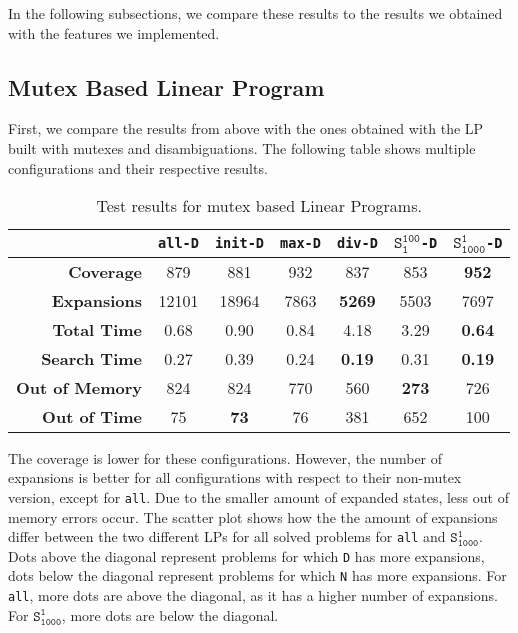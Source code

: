 In the following subsections, we compare these results to the results we obtained with the features we implemented.

\subsection{Mutex Based Linear Program}\label{subsec:mutex-based-linear-program}
First, we compare the results from above with the ones obtained with the LP built with mutexes and disambiguations.
The following table shows multiple configurations and their respective results.

\begin{table}[h!]
    \begin{center}
        \begin{tabular}{|r|c|c|c|c|c|c|}
            \hline
            & \textbf{\texttt{all-D}} & \textbf{\texttt{init-D}} & \textbf{\texttt{max-D}} & \textbf{\texttt{div-D}} & \textbf{$\texttt{S}_\texttt{1}^\texttt{100}$\texttt{-D}}& \textbf{$\texttt{S}_\texttt{1000}^\texttt{1}$\texttt{-D}}\\
            \hline \hline
            \textbf{Coverage}       & 879   & 881           & 932   & 837           & 853           & \textbf{952}  \\ \hline
            \textbf{Expansions}     & 12101 & 18964         & 7863  & \textbf{5269} & 5503          & 7697          \\ \hline
            \textbf{Total Time}     & 0.68  & 0.90          & 0.84  & 4.18          & 3.29          & \textbf{0.64} \\ \hline
            \textbf{Search Time}    & 0.27  & 0.39          & 0.24  & \textbf{0.19} & 0.31          & \textbf{0.19} \\ \hline
            \textbf{Out of Memory}  & 824   & 824           & 770   & 560           & \textbf{273}  & 726           \\ \hline
            \textbf{Out of Time}    & 75    & \textbf{73}   & 76    & 381           & 652           & 100           \\ \hline
        \end{tabular}
        \caption{Test results for mutex based Linear Programs.}
        \label{table:mutex_lp}
    \end{center}
\end{table}

The coverage is lower for these configurations.
However, the number of expansions is better for all configurations with respect to their non-mutex version, except for \texttt{all}.
Due to the smaller amount of expanded states, less out of memory errors occur.
The scatter plot  shows how the the amount of expansions differ between the two different LPs for all solved problems for \texttt{all} and $\texttt{S}_\texttt{1000}^\texttt{1}$.
Dots above the diagonal represent problems for which \texttt{D} has more expansions, dots below the diagonal represent problems for which \texttt{N} has more expansions.
For \texttt{all}, more dots are above the diagonal, as it has a higher number of expansions.
For $\texttt{S}_\texttt{1000}^\texttt{1}$, more dots are below the diagonal.

